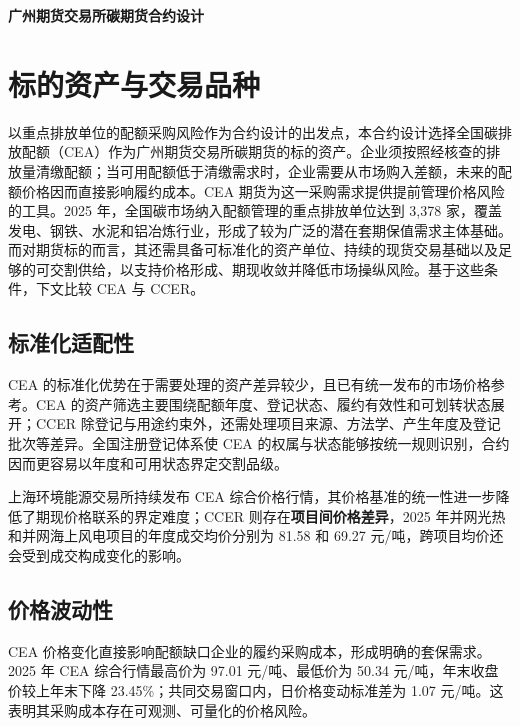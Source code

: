 \documentclass[UTF8,a4paper,11pt,oneside,fontset=fandol]{ctexart}
\newcommand{\ReportTitle}{广州期货交易所碳期货合约设计}
\begin{document}
\thispagestyle{plain} %
\begin{center}
  {\LARGE\bfseries \ReportTitle\par}
\end{center}
\vspace{0.5em}

\section{标的资产与交易品种}
以重点排放单位的配额采购风险作为合约设计的出发点，本合约设计选择全国碳排放配额（CEA）作为广州期货交易所碳期货的标的资产。企业须按照经核查的排放量清缴配额\cite{state2024}；当可用配额低于清缴需求时，企业需要从市场购入差额，未来的配额价格因而直接影响履约成本。CEA 期货为这一采购需求提供提前管理价格风险的工具。2025 年，全国碳市场纳入配额管理的重点排放单位达到 3,378 家，覆盖发电、钢铁、水泥和铝冶炼行业\cite{mee2026}，形成了较为广泛的潜在套期保值需求主体基础。
而对期货标的而言，其还需具备可标准化的资产单位、持续的现货交易基础以及足够的可交割供给，以支持价格形成、期现收敛并降低市场操纵风险。基于这些条件，下文比较 CEA 与 CCER。

\renewcommand{\thesubsection}{\Alph{subsection}.}
\subsection{标准化适配性}
CEA 的标准化优势在于需要处理的资产差异较少，且已有统一发布的市场价格参考。CEA 的资产筛选主要围绕配额年度、登记状态、履约有效性和可划转状态展开\cite{mee2021reg,mee2024carryover}；CCER 除登记与用途约束外，还需处理项目来源、方法学、产生年度及登记批次等差异\cite{ccer2023}。全国注册登记体系使 CEA 的权属与状态能够按统一规则识别\cite{mee2021reg}，合约因而更容易以年度和可用状态界定交割品级。

上海环境能源交易所持续发布 CEA 综合价格行情\cite{she2025daily}，其价格基准的统一性进一步降低了期现价格联系的界定难度；CCER 则存在\textbf{项目间价格差异}，2025 年并网光热和并网海上风电项目的年度成交均价分别为 81.58 和 69.27 元/吨\cite{ccer2025annual}，跨项目均价还会受到成交构成变化的影响。

\subsection{价格波动性}
CEA 价格变化直接影响配额缺口企业的履约采购成本，形成明确的套保需求。2025 年 CEA 综合行情最高价为 97.01 元/吨、最低价为 50.34 元/吨，年末收盘价较上年末下降 23.45\%\cite{she2025annual}；共同交易窗口内，日价格变动标准差为 1.07 元/吨。这表明其采购成本存在可观测、可量化的价格风险。
\end{document}
